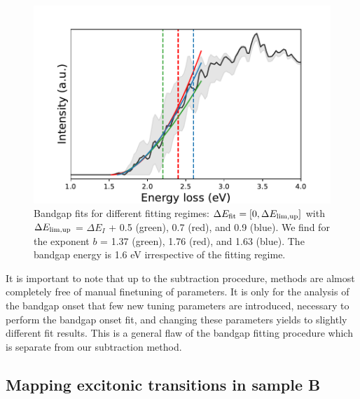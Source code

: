 \begin{figure}[H]
\begin{centering}
  \includegraphics[width=0.7\linewidth]{plots/bandgap_different_regimes.pdf} 
  \caption{Bandgap fits for different fitting regimes: 
  $\Delta E_{\rm fit}= [0, \Delta E_{\rm lim,up}]$ 
  with $\Delta E_{\rm lim,up}$ = $\Delta E_I$ + 0.5 (green), 0.7 (red), and 0.9 (blue). 
  We find for the exponent $b$ = 1.37 (green), 1.76 (red), and 1.63 (blue).
  The bandgap energy is 1.6 eV irrespective of the fitting regime.
  }
\label{fig:fitregime}
\end{centering}
\end{figure}
%

It is important to note that up to the subtraction procedure, 
methods are almost completely free of manual finetuning
of parameters.
%
It is only for the analysis of the bandgap onset that 
few new tuning parameters are introduced, necessary to perform 
the bandgap onset fit, and changing these parameters
yields to slightly different fit results.
%
This is a general flaw of the bandgap fitting procedure 
which is separate from our subtraction method.


\subsection{Mapping excitonic transitions in sample B}

